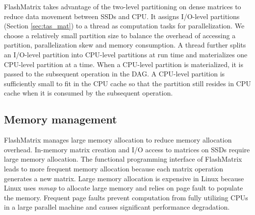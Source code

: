 
FlashMatrix takes advantage of the two-level
partitioning on dense matrices to reduce data movement between SSDs and CPU.
It assigns I/O-level partitions (Section \ref{sec:tas_mat}) to a thread as
computation tasks for parallelization. We choose a relatively small partition
size to balance the overhead of accessing a partition, parallelization skew
and memory consumption. A thread further splits an I/O-level partition into
CPU-level partitions at run time and materializes one CPU-level partition at
a time. When a CPU-level partition is materialized, it is passed to the
subsequent operation in the DAG. A CPU-level partition is sufficiently small
to fit in the CPU cache so that the partition still resides in CPU cache when
it is consumed by the subsequent operation. %



\subsection{Memory management} \label{sec:mem}
FlashMatrix manages large memory allocation to reduce memory allocation overhead.
In-memory matrix creation and I/O access to matrices on SSDs require large memory
allocation. The functional programming interface of FlashMatrix leads to more
frequent memory allocation because each matrix operation generates a new matrix. 
Large memory allocation is expensive in Linux because Linux uses \textit{mmap}
to allocate large memory and relies on page fault to populate the memory.
Frequent page faults prevent computation from fully utilizing CPUs in a large
parallel machine and causes significant performance degradation.

